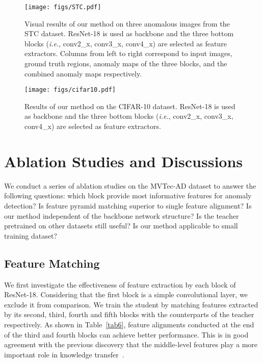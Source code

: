 \documentclass[final]{cvpr}
\begin{document}
{\begin{figure}[!t]
	\centering
	\texttt{[image: figs/STC.pdf]}
	\caption{Visual results of our method on three anomalous images from the STC dataset. ResNet-18 is used as backbone and the three bottom blocks (\textit{i.e.}, conv2\_x, conv3\_x, conv4\_x) are selected as feature extractors. Columns from left to right correspond to input images, ground truth regions, anomaly maps of the three blocks, and the combined anomaly maps respectively.}
	\label{fig3}
\end{figure}


\begin{figure}[!t]
	\centering
	\texttt{[image: figs/cifar10.pdf]}
	\caption{Results of our method on the CIFAR-10 dataset. ResNet-18 is used as backbone and the three bottom blocks (\textit{i.e.}, conv2\_x, conv3\_x, conv4\_x) are selected as feature extractors.}
	\label{fig4}
\end{figure}


\section{Ablation Studies and Discussions}
\label{sec5}

We conduct a series of ablation studies on the MVTec-AD dataset to answer the following questions: which block provide most informative features for anomaly detection? Is feature pyramid matching superior to single feature alignment? Is our method independent of the backbone network structure? Is the teacher pretrained on other datasets still useful? Is our method applicable to small training dataset?

\subsection{Feature Matching}
\label{sec5-sub1}

We first investigate the effectiveness of feature extraction by each block of ResNet-18. Considering that the first block is a simple convolutional layer, we exclude it from comparison. We train the student by matching features extracted by its second, third, fourth and fifth blocks with the counterparts of the teacher respectively. As shown in Table~\ref{tab6}, feature alignments conducted at the end of the third and fourth blocks can achieve better performance. This is in good agreement with the previous discovery that the middle-level features play a more important role in knowledge transfer~\cite{Oquab2014}.

}
\end{document}
